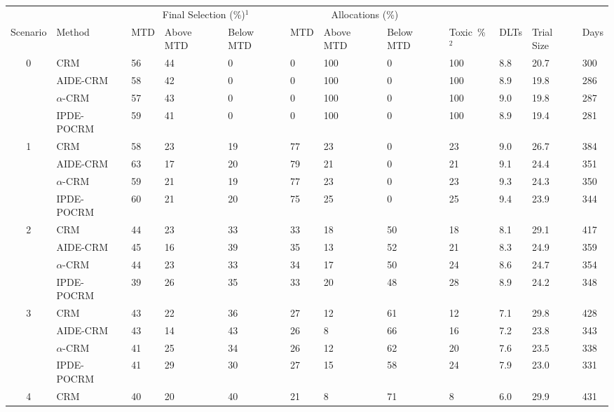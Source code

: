 \begin{tabular*}{\textwidth}{@{\extracolsep\fill}clllllllllll@{\extracolsep\fill}}
\toprule
&  & \multicolumn{3}{c}{Final Selection (\%)$^1$} & \multicolumn{3}{c}{Allocations (\%)} & &  &  &  \\
\multirow{2}{2em}{Scenario} & \multirow{2}{2em}{Method} & \multirow{2}{2em}{MTD} & \multirow{2}{2em}{Above MTD} & \multirow{2}{2em}{Below MTD} & \multirow{2}{2em}{MTD} & \multirow{2}{2em}{Above MTD} & \multirow{2}{2em}{Below MTD} & \multirow{2}{2em}{Toxic~\%$^2$} & \multirow{2}{2em}{DLTs} & \multirow{2}{2em}{Trial Size} & \multirow{2}{2em}{Days}  \\ \\ 
\midrule
\multirow{4}{2em}{0} & CRM & 56 & 44 & 0 & 0 & 100 & 0 & 100 & 8.8 & 20.7 & 300\\
 & AIDE-CRM & 58 & 42 & 0 & 0 & 100 & 0 & 100 & 8.9 & 19.8 & 286\\
 & $\alpha$-CRM & 57 & 43 & 0 & 0 & 100 & 0 & 100 & 9.0 & 19.8 & 287\\
 & IPDE-POCRM & 59 & 41 & 0 & 0 & 100 & 0 & 100 & 8.9 & 19.4 & 281\\
\midrule
\multirow{4}{2em}{1} & CRM & 58 & 23 & 19 & 77 & 23 & 0 & 23 & 9.0 & 26.7 & 384\\
 & AIDE-CRM & 63 & 17 & 20 & 79 & 21 & 0 & 21 & 9.1 & 24.4 & 351\\
 & $\alpha$-CRM & 59 & 21 & 19 & 77 & 23 & 0 & 23 & 9.3 & 24.3 & 350\\
 & IPDE-POCRM & 60 & 21 & 20 & 75 & 25 & 0 & 25 & 9.4 & 23.9 & 344\\
\midrule
\multirow{4}{2em}{2} & CRM & 44 & 23 & 33 & 33 & 18 & 50 & 18 & 8.1 & 29.1 & 417\\
 & AIDE-CRM & 45 & 16 & 39 & 35 & 13 & 52 & 21 & 8.3 & 24.9 & 359\\
 & $\alpha$-CRM & 44 & 23 & 33 & 34 & 17 & 50 & 24 & 8.6 & 24.7 & 354\\
 & IPDE-POCRM & 39 & 26 & 35 & 33 & 20 & 48 & 28 & 8.9 & 24.2 & 348\\
\midrule
\multirow{4}{2em}{3} & CRM & 43 & 22 & 36 & 27 & 12 & 61 & 12 & 7.1 & 29.8 & 428\\
 & AIDE-CRM & 43 & 14 & 43 & 26 & 8 & 66 & 16 & 7.2 & 23.8 & 343\\
 & $\alpha$-CRM & 41 & 25 & 34 & 26 & 12 & 62 & 20 & 7.6 & 23.5 & 338\\
 & IPDE-POCRM & 41 & 29 & 30 & 27 & 15 & 58 & 24 & 7.9 & 23.0 & 331\\
\midrule
\multirow{4}{2em}{4} & CRM & 40 & 20 & 40 & 21 & 8 & 71 & 8 & 6.0 & 29.9 & 431\\

\end{tabular*}
